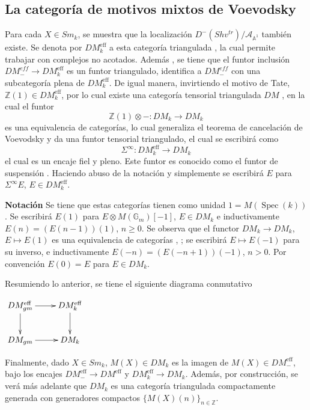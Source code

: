 \documentclass[10pt]{amsart}
\theoremstyle{definition}
\theoremstyle{remark}
\theoremstyle{definition}
\begin{document}
\subsection{La categoría de motivos mixtos de Voevodsky}
Para cada $X \in Sm_{\mathit{k}}$, se muestra que la localización $D^{-}(Shv^{tr})/\mathcal{A}_{\mathbb{A}^1}$ también existe. Se denota por $DM^{\mathrm{eff}}_{k}$ a esta categoría triangulada \cite[Thm. 4.3.76]{Ayo07}, la cual permite trabajar con complejos no acotados. Además , se tiene que el funtor inclusión $DM^{eff}_{-} \rightarrow DM^{\mathrm{eff}}_{k}$ es un funtor triangulado, identifica a $DM^{eff}_{-}$ con una subcategoría plena de $DM^{\mathrm{eff}}_{k}$. De igual manera, invirtiendo el motivo de Tate, $\mathbb{Z}(1) \in DM^{\mathrm{eff}}_{k}$, por lo cual existe una categoría tensorial triangulada $DM$ \cite[Prop. 4.3.77]{Ayo07}, en la cual el funtor
\begin{equation*}
\mathbb{Z}(1) \otimes -:DM_{k} \rightarrow DM_{k}
\end{equation*}
es una equivalencia de categorías, lo cual generaliza el teorema de cancelación de Voevodsky y da una funtor tensorial triangulado, el cual se escribirá como 
\begin{equation*}
\Sigma^{\infty}:DM^{\mathrm{eff}}_{k} \rightarrow DM_{k}
\end{equation*}
el cual es un encaje fiel y pleno. Este funtor es conocido como el funtor de suspensión \cite[7.3]{Hov01}. Haciendo abuso de la notación y simplemente se escribirá $E$ para $\Sigma^{\infty}E$, $E\in DM_{k}^{\mathrm{eff}}$.

\textbf{Notación} Se tiene que estas categorías tienen como unidad $1=M(\operatorname{Spec}(k))$. Se escribirá $E(1)$ para $E\otimes M(\mathbb{G}_{m})[-1]$, $E\in DM_{k}$ e inductivamente $E(n)=(E(n-1))(1)$, $n\geq 0$. Se observa que el functor $DM_{k}\to DM_{k}$, $E\mapsto E(1)$ es una equivalencia de categorías \cite[8.10]{Hov01}, \cite[Thm. 4.3.38]{Ayo07}; se escribirá $E\mapsto E(-1)$ para su inverso, e inductivamente $E(-n)=(E(-n+1))(-1)$, $n>0$. Por convención $E(0)=E$ para $E\in DM_{k}$.

Resumiendo lo anterior, se tiene el siguiente diagrama conmutativo
\begin{center}
		$\xymatrix{
		 DM^{\mathrm{eff}}_{gm}\ar[d]\ar[r] & DM^{\mathrm{eff}}_{k}\ar[d]\\
		DM_{gm}\ar[r]  & DM_{k}}$ 
	\end{center} 

Finalmente, dado $X \in Sm_{\mathit{k}}$, $M(X) \in DM_{k}$ es la imagen de $M(X)\in DM^{\mathrm{eff}}_{-}$, bajo los encajes $DM^{\mathrm{eff}}_{-} \rightarrow DM^{\mathrm{eff}}$ y $DM^{\mathrm{eff}}_{k} \rightarrow DM_{k}$. Además, por construcción, se verá más adelante que $DM_{k}$ es una categoría triangulada compactamente generada con generadores compactos $\{M(X)(n)\}_{n \in \mathbb{Z}}$.
\end{document}
